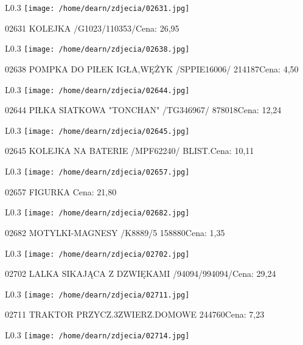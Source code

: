 \begin{wrapfigure}{L}{0.3\textwidth}
\texttt{[image: /home/dearn/zdjecia/02631.jpg]}
\end{wrapfigure}
02631 KOLEJKA /G1023/110353/Cena: 26,95\newline
\begin{wrapfigure}{L}{0.3\textwidth}
\texttt{[image: /home/dearn/zdjecia/02638.jpg]}
\end{wrapfigure}
02638 POMPKA DO PIŁEK IGŁA,WĘŻYK /SPPIE16006/         214187Cena: 4,50\newline
\begin{wrapfigure}{L}{0.3\textwidth}
\texttt{[image: /home/dearn/zdjecia/02644.jpg]}
\end{wrapfigure}
02644 PIŁKA SIATKOWA "TONCHAN"  /TG346967/            878018Cena: 12,24\newline
\begin{wrapfigure}{L}{0.3\textwidth}
\texttt{[image: /home/dearn/zdjecia/02645.jpg]}
\end{wrapfigure}
02645 KOLEJKA NA BATERIE /MPF62240/   BLIST.Cena: 10,11\newline
\begin{wrapfigure}{L}{0.3\textwidth}
\texttt{[image: /home/dearn/zdjecia/02657.jpg]}
\end{wrapfigure}
02657 FIGURKA Cena: 21,80\newline
\begin{wrapfigure}{L}{0.3\textwidth}
\texttt{[image: /home/dearn/zdjecia/02682.jpg]}
\end{wrapfigure}
02682 MOTYLKI-MAGNESY  /K8889/5                       158880Cena: 1,35\newline
\begin{wrapfigure}{L}{0.3\textwidth}
\texttt{[image: /home/dearn/zdjecia/02702.jpg]}
\end{wrapfigure}
02702 LALKA SIKAJĄCA Z DZWIĘKAMI /94094/994094/Cena: 29,24\newline
\begin{wrapfigure}{L}{0.3\textwidth}
\texttt{[image: /home/dearn/zdjecia/02711.jpg]}
\end{wrapfigure}
02711 TRAKTOR PRZYCZ.3ZWIERZ.DOMOWE 244760Cena: 7,23\newline
\begin{wrapfigure}{L}{0.3\textwidth}
\texttt{[image: /home/dearn/zdjecia/02714.jpg]}
\end{wrapfigure}
